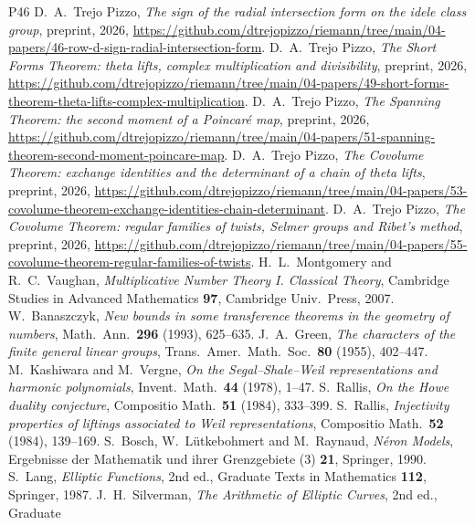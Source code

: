 \documentclass[10pt]{amsart}
\theoremstyle{definition}
\theoremstyle{remark}
\begin{document}
\begin{thebibliography}{P46}
 D.~A.~Trejo Pizzo, \emph{The sign of the radial intersection form on the idele class group}, preprint, 2026, \url{https://github.com/dtrejopizzo/riemann/tree/main/04-papers/46-row-d-sign-radial-intersection-form}.
 D.~A.~Trejo Pizzo, \emph{The Short Forms Theorem: theta lifts, complex multiplication and divisibility}, preprint, 2026, \url{https://github.com/dtrejopizzo/riemann/tree/main/04-papers/49-short-forms-theorem-theta-lifts-complex-multiplication}.
 D.~A.~Trejo Pizzo, \emph{The Spanning Theorem: the second moment of a Poincar\'e map}, preprint, 2026, \url{https://github.com/dtrejopizzo/riemann/tree/main/04-papers/51-spanning-theorem-second-moment-poincare-map}.
 D.~A.~Trejo Pizzo, \emph{The Covolume Theorem: exchange identities and the determinant of a chain of theta lifts}, preprint, 2026, \url{https://github.com/dtrejopizzo/riemann/tree/main/04-papers/53-covolume-theorem-exchange-identities-chain-determinant}.
 D.~A.~Trejo Pizzo, \emph{The Covolume Theorem: regular families of twists, Selmer groups and Ribet's method}, preprint, 2026, \url{https://github.com/dtrejopizzo/riemann/tree/main/04-papers/55-covolume-theorem-regular-families-of-twists}.
 H.~L.~Montgomery and R.~C.~Vaughan, \emph{Multiplicative Number Theory I.
Classical Theory}, Cambridge Studies in Advanced Mathematics \textbf{97}, Cambridge
Univ.~Press, 2007.
 W.~Banaszczyk, \emph{New bounds in some transference theorems in the geometry
of numbers}, Math.\ Ann.\ \textbf{296} (1993), 625--635.
 J.~A.~Green, \emph{The characters of the finite general linear groups},
Trans.\ Amer.\ Math.\ Soc.\ \textbf{80} (1955), 402--447.
 M.~Kashiwara and M.~Vergne, \emph{On the Segal--Shale--Weil
representations and harmonic polynomials}, Invent.\ Math.\ \textbf{44} (1978), 1--47.
 S.~Rallis, \emph{On the Howe duality conjecture}, Compositio Math.\ \textbf{51} (1984), 333--399.
 S.~Rallis, \emph{Injectivity properties of liftings associated to
Weil representations}, Compositio Math.\ \textbf{52} (1984), 139--169.
 S.~Bosch, W.~L\"utkebohmert and M.~Raynaud, \emph{N\'eron Models}, Ergebnisse der
Mathematik und ihrer Grenzgebiete (3) \textbf{21}, Springer, 1990.
 S.~Lang, \emph{Elliptic Functions}, 2nd ed., Graduate Texts in Mathematics
\textbf{112}, Springer, 1987.
 J.~H.~Silverman, \emph{The Arithmetic of Elliptic Curves}, 2nd ed., Graduate

\end{thebibliography}
\end{document}
